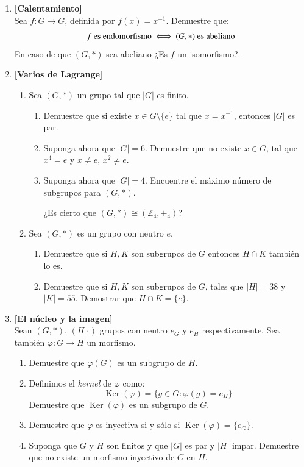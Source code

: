 \documentclass[letterpaper,10pt]{article}
\newcommand{\Z}{\mathbb Z}
\DeclareMathOperator{\Ker}{Ker}
\theoremstyle{plain}
\begin{document}
\begin{enumerate}[\bf P1.]
    \item \textbf{[Calentamiento]}\\Sea $f : G \to G$, definida por $f(x)=x^{-1}$. Demuestre que:
	$$
	\text{$f$ es endomorfismo $ \iff $ $(G,*)$ es abeliano}
	$$
	En caso de que $(G,*)$ sea abeliano ¿Es $f$ un isomorfismo?.
    \item \textbf{[Varios de Lagrange]}
        \begin{enumerate}
            \item Sea $(G,*)$ un grupo tal que $|G|$ es finito.
                \begin{enumerate}
                    \item  Demuestre que si existe $x\in G\setminus \{e\}$ tal que $x=x^{-1}$, entonces $|G|$ es par. 
                	\item   Suponga ahora que $|G|=6$. Demuestre que no existe $x\in G$, tal que $x^4=e$ y $x\neq e$, $x^2 \neq e$.
                	\item   Suponga ahora que $|G|=4$. Encuentre el máximo número de subgrupos para $(G,*)$. 
                	
                	¿Es cierto que  $(G,*)\cong(\Z_4,+_4)$?
                \end{enumerate}
            \item Sea $(G,*)$ es un grupo con neutro $e$.
                \begin{enumerate}
                    \item Demuestre que si $H,K$ son subgrupos de $G$ entonces $H\cap K$ también lo es.
                    \item Demuestre que si $H,K$ son subgrupos de $G$, tales que $|H|=38$ y $|K|=55$. Demostrar que $H\cap K=\{e\}$.
                \end{enumerate}
        \end{enumerate}
    
    \item \textbf{[El núcleo y la imagen]}\\Sean $(G,*)$, $(H\cdot)$ grupos con neutro $e_G$ y $e_H$ respectivamente. Sea también $\varphi : G \to H$ un morfismo.
        \begin{enumerate}
        	\item Demuestre que $\varphi (G)$ es un subgrupo de $H$.
        	\item Definimos el \emph{kernel} de $\varphi$ como:
        	$$
        	\Ker (\varphi) = \{g \in G : \varphi(g)=e_H \}
        	$$
        	Demuestre que $\Ker (\varphi)$ es un subgrupo de $G$.
        	\item Demuestre que $\varphi$ es inyectiva si y sólo si $\Ker (\varphi) = \{ e_G \}$.
        	\item Suponga que $G$ y $H$ son finitos y que $|G|$ es par y $|H|$ impar. Demuestre que no existe un morfismo inyectivo de $G$ en $H$.
        \end{enumerate}


\end{enumerate}
\end{document}
